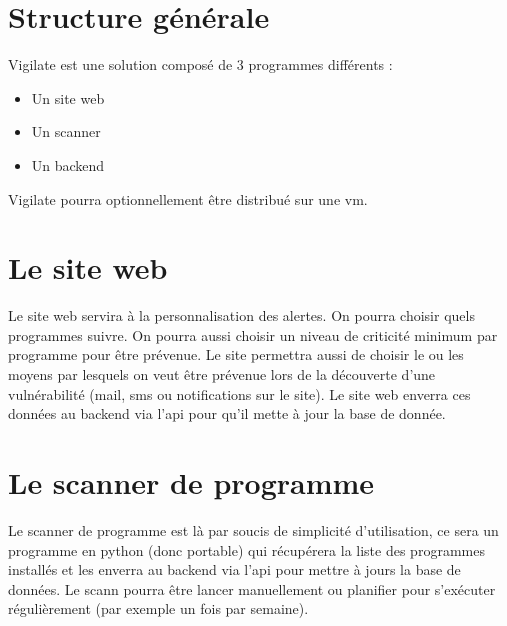 \section{Structure générale}
Vigilate est une solution composé de 3 programmes différents :\\
\begin{itemize}
\item Un site web\\
\item Un scanner\\
\item Un backend\\
\end{itemize}
Vigilate pourra optionnellement être distribué sur une vm.\\
\section{Le site web}
Le site web servira à la personnalisation des alertes. On pourra choisir quels programmes suivre. On pourra aussi choisir un niveau de criticité minimum par programme pour être prévenue. Le site permettra aussi de choisir le ou les moyens par lesquels on veut être prévenue lors de la découverte d’une vulnérabilité (mail, sms ou notifications sur le site). Le site web enverra ces données au backend via l’api pour qu’il mette à jour la base de donnée.\\

\section{Le scanner de programme}
Le scanner de programme est là par soucis de simplicité d’utilisation, ce sera un programme en python (donc portable) qui récupérera la liste des programmes installés et les enverra au backend via l’api pour mettre à jours la base de données. Le scann pourra être lancer manuellement ou planifier pour s’exécuter régulièrement (par exemple un fois par semaine).\\

